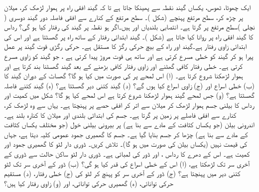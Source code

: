 ایک چھوٹا، ٹھوس، یکساں گیند نقطہ  سے پھینکا جاتا  ہے تا کہ گیند  افقی راہ  پر ہموار لڑھک کر، میلان پر چڑھ کر، سطح مرتفع پہنچے (شکل )۔   سطح مرتفع کے کنارے سے افقی فاصلہ    دور   گیند دوسری ( نچلی )سطح مرتفع پر گرتا ہے۔ انتصابی بلندیاں  اور  ہیں۔اگر  ہو  نقطہ  پر گیند کی رفتار کیا  ہو گی؟
رداس  کا گیند افقی راہ پر روانا کیا جاتا ہے (شکل )۔  گیند ابتدائی
 رفتار   کے ساتھ  راہ پر  گھسٹتا  ہے   اور اس کی ابتدائی  زاوی رفتار  ہے۔گیند اور راہ کے بیچ حرکی رگڑ کا مستقل   ہے۔ حرکی رگڑی قوت  گیند پر عمل پیرا  ہو کر  گیند کو خطی  مسرع کرتی ہے اور ساتھ ہی  قوت مروڑ پیدا کرتی ہے ، جو گیند  کو زاوی  مسرع کرتی  ہے۔  خطی رفتار     کافی گھٹنے اور زاوی رفتار    کافی بڑھنے کے بعد  گیند گھسٹنا بند کرتا ہے اور  ہموار لڑھکنا شروع کرتا ہے۔ (ا)  اس لمحے پر  کی صورت میں  کیا ہو گا؟  گھساٹ کے  دوران گیند کا (ب)  خطی اسراع اور (ج) زاوی اسراع کیا  ہوں گے؟ (د) گیند کتنی دیر گھسٹتا ہے؟ (ہ) گیند کتنے فاصلہ گھسٹتا ہے؟ (و)  جس لمحے گیند  ہموار  لڑھکنا شروع کرتا ہے اس لمحے  کیا ہو گا؟
   شکل  میں کمیت  اور رداس  کا   بیلنی جسم   ہموار لڑھک کر میلان  سے  اتر کر افقی حصے پر پہنچتا ہے۔ یہاں سے  وہ لڑھک کر، کنارے سے   افقی فاصلے پر   زمین پر گرتا ہے۔ جسم کی ابتدائی بلندی  اور میلان کا کنارہ  بلند ہے۔ اندرونی بیلن (جو یکساں کثافت کے مادے سے بنا ہے) پر بیرونی بیلنی خول (جو مختلف یکساں کثافت کے مادے سے بنا ہے) چڑھا کر جسم بنایا گیا ہے۔ جسم کا گھمیری جمود  عمومی کلیہ  دیتا ہے، جہاں  کی قیمت  نہیں (یکساں بیلن کی صورت میں  ہو گا)۔  تلاش کریں۔
ڈوری دار لٹو کا گھمیری جمود   اور  کمیت  ہے۔ اس کے دھرے کا رداس ، اور ڈور کی لمبائی  ہے۔ ڈوری دار لٹو ساکن حالت سے ڈوری  کے آخری سر تک لڑھکتا ہے، (ا) اس کے خطی اسراع کی قدر کیا ہو گی؟ (ب)  ڈور کے آخری سر تک لٹو  کتنی دیر میں پہنچتا ہے؟ (ج)  ڈور کے آخری سر کو پہنچ کر  لٹو کی (ج) خطی رفتار، (د) مستقیم حرکی توانائی، (ہ) گھمیری حرکی توانائی، اور (و) زاوی رفتار کیا ہیں؟
